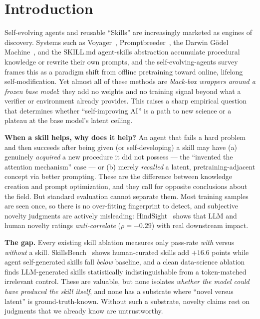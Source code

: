 \section{Introduction}
\label{sec:intro}

Self-evolving agents and reusable ``Skills'' are increasingly marketed as engines of
discovery. Systems such as Voyager~\citep{voyager}, Promptbreeder~\citep{promptbreeder}, the
Darwin G\"odel Machine~\citep{dgm}, and the SKILL.md agent-skills abstraction accumulate
procedural knowledge or rewrite their own prompts, and the self-evolving-agents
survey~\citep{selfevolvesurvey} frames this as a paradigm shift from offline pretraining
toward online, lifelong self-modification. Yet almost all of these methods are
\emph{black-box wrappers around a frozen base model}: they add no weights and no training
signal beyond what a verifier or environment already provides. This raises a sharp empirical
question that determines whether ``self-improving AI'' is a path to new science or a plateau
at the base model's latent ceiling.

{\bf When a skill helps, why does it help?} An agent that fails a hard problem and then
succeeds after being given (or self-developing) a skill may have (a) genuinely \emph{acquired}
a new procedure it did not possess --- the ``invented the attention mechanism'' case --- or
(b) merely \emph{recalled} a latent, pretraining-adjacent concept via better prompting. These
are the difference between knowledge creation and prompt optimization, and they call for
opposite conclusions about the field. But standard evaluation cannot separate them. Most
training samples are seen once, so there is no over-fitting fingerprint to detect, and
subjective novelty judgments are actively misleading: HindSight~\citep{hindsight} shows that
LLM and human novelty ratings \emph{anti-correlate} ($\rho=-0.29$) with real downstream impact.

{\bf The gap.} Every existing skill ablation measures only pass-rate \emph{with} versus
\emph{without} a skill. SkillsBench~\citep{skillsbench} shows human-curated skills add
$+16.6$ points while agent self-generated skills fall \emph{below} baseline, and a clean
data-science ablation~\citep{dsskills} finds LLM-generated skills statistically
indistinguishable from a token-matched irrelevant control. These are valuable, but none
isolates \emph{whether the model could have produced the skill itself}, and none has a
substrate where ``novel versus latent'' is ground-truth-known. Without such a substrate,
novelty claims rest on judgments that we already know are untrustworthy.

